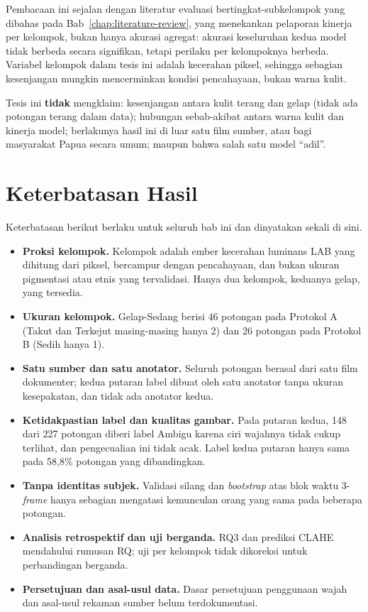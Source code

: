 Pembacaan ini sejalan dengan literatur evaluasi bertingkat-subkelompok yang dibahas pada Bab~\ref{chap:literature-review}, yang menekankan pelaporan kinerja per kelompok, bukan hanya akurasi agregat: akurasi keseluruhan kedua model tidak berbeda secara signifikan, tetapi perilaku per kelompoknya berbeda. Variabel kelompok dalam tesis ini adalah kecerahan piksel, sehingga sebagian kesenjangan mungkin mencerminkan kondisi pencahayaan, bukan warna kulit.

Tesis ini \textbf{tidak} mengklaim: kesenjangan antara kulit terang dan gelap (tidak ada potongan terang dalam data); hubungan sebab-akibat antara warna kulit dan kinerja model; berlakunya hasil ini di luar satu film sumber, atau bagi masyarakat Papua secara umum; maupun bahwa salah satu model ``adil''.

\section{Keterbatasan Hasil}
\label{sec:results-limitations}

Keterbatasan berikut berlaku untuk seluruh bab ini dan dinyatakan sekali di sini.
\begin{itemize}
  \item \textbf{Proksi kelompok.} Kelompok adalah ember kecerahan luminans LAB yang dihitung dari piksel, bercampur dengan pencahayaan, dan bukan ukuran pigmentasi atau etnis yang tervalidasi. Hanya dua kelompok, keduanya gelap, yang tersedia.
  \item \textbf{Ukuran kelompok.} Gelap-Sedang berisi 46 potongan pada Protokol A (Takut dan Terkejut masing-masing hanya 2) dan 26 potongan pada Protokol B (Sedih hanya 1).
  \item \textbf{Satu sumber dan satu anotator.} Seluruh potongan berasal dari satu film dokumenter; kedua putaran label dibuat oleh satu anotator tanpa ukuran kesepakatan, dan tidak ada anotator kedua.
  \item \textbf{Ketidakpastian label dan kualitas gambar.} Pada putaran kedua, 148 dari 227 potongan diberi label Ambigu karena ciri wajahnya tidak cukup terlihat, dan pengecualian ini tidak acak. Label kedua putaran hanya sama pada 58,8\% potongan yang dibandingkan.
  \item \textbf{Tanpa identitas subjek.} Validasi silang dan \textit{bootstrap} atas blok waktu 3-\textit{frame} hanya sebagian mengatasi kemunculan orang yang sama pada beberapa potongan.
  \item \textbf{Analisis retrospektif dan uji berganda.} RQ3 dan prediksi CLAHE mendahului rumusan RQ; uji per kelompok tidak dikoreksi untuk perbandingan berganda.
  \item \textbf{Persetujuan dan asal-usul data.} Dasar persetujuan penggunaan wajah dan asal-usul rekaman sumber belum terdokumentasi.
\end{itemize}


